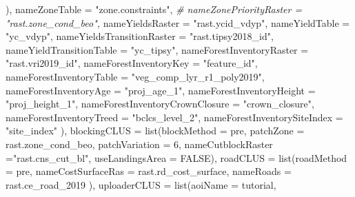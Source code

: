 \documentclass[
]{article}
\newenvironment{Shaded}{\begin{snugshade}}{\end{snugshade}}
\newcommand{\AttributeTok}[1]{\textcolor[rgb]{0.77,0.63,0.00}{#1}}
\newcommand{\CommentTok}[1]{\textcolor[rgb]{0.56,0.35,0.01}{\textit{#1}}}
\newcommand{\ConstantTok}[1]{\textcolor[rgb]{0.00,0.00,0.00}{#1}}
\newcommand{\DecValTok}[1]{\textcolor[rgb]{0.00,0.00,0.81}{#1}}
\newcommand{\FunctionTok}[1]{\textcolor[rgb]{0.00,0.00,0.00}{#1}}
\newcommand{\NormalTok}[1]{#1}
\newcommand{\StringTok}[1]{\textcolor[rgb]{0.31,0.60,0.02}{#1}}
\begin{document}
\begin{Shaded}
\begin{Highlighting}[]
\NormalTok{                          ), }
                         \AttributeTok{nameZoneTable =} \StringTok{"zone.constraints"}\NormalTok{, }
                        \CommentTok{\# nameZonePriorityRaster = "rast.zone\_cond\_beo",}
                         \AttributeTok{nameYieldsRaster =} \StringTok{"rast.ycid\_vdyp"}\NormalTok{, }
                         \AttributeTok{nameYieldTable =} \StringTok{"yc\_vdyp"}\NormalTok{, }
                         \AttributeTok{nameYieldsTransitionRaster =} \StringTok{"rast.tipsy2018\_id"}\NormalTok{, }
                         \AttributeTok{nameYieldTransitionTable =} \StringTok{"yc\_tipsy"}\NormalTok{, }
                         \AttributeTok{nameForestInventoryRaster =} \StringTok{"rast.vri2019\_id"}\NormalTok{, }
                         \AttributeTok{nameForestInventoryKey =} \StringTok{"feature\_id"}\NormalTok{, }
                         \AttributeTok{nameForestInventoryTable =} \StringTok{"veg\_comp\_lyr\_r1\_poly2019"}\NormalTok{, }
                         \AttributeTok{nameForestInventoryAge =} \StringTok{"proj\_age\_1"}\NormalTok{, }
                         \AttributeTok{nameForestInventoryHeight =} \StringTok{"proj\_height\_1"}\NormalTok{, }
                         \AttributeTok{nameForestInventoryCrownClosure =} \StringTok{"crown\_closure"}\NormalTok{, }
                         \AttributeTok{nameForestInventoryTreed =} \StringTok{"bclcs\_level\_2"}\NormalTok{,}
                         \AttributeTok{nameForestInventorySiteIndex =} \StringTok{"site\_index"}  
\NormalTok{                    ),}
  \AttributeTok{blockingCLUS =} \FunctionTok{list}\NormalTok{(}\AttributeTok{blockMethod =} \StringTok{\textquotesingle{}pre\textquotesingle{}}\NormalTok{, }
                      \AttributeTok{patchZone =} \StringTok{\textquotesingle{}rast.zone\_cond\_beo\textquotesingle{}}\NormalTok{, }
                      \AttributeTok{patchVariation =} \DecValTok{6}\NormalTok{,}
                      \AttributeTok{nameCutblockRaster =}\StringTok{"rast.cns\_cut\_bl"}\NormalTok{, }
                      \AttributeTok{useLandingsArea =} \ConstantTok{FALSE}\NormalTok{),}
  \AttributeTok{roadCLUS =} \FunctionTok{list}\NormalTok{(}\AttributeTok{roadMethod =} \StringTok{\textquotesingle{}pre\textquotesingle{}}\NormalTok{,}
                  \AttributeTok{nameCostSurfaceRas =} \StringTok{\textquotesingle{}rast.rd\_cost\_surface\textquotesingle{}}\NormalTok{, }
                  \AttributeTok{nameRoads =}  \StringTok{\textquotesingle{}rast.ce\_road\_2019\textquotesingle{}}
\NormalTok{                  ),}
  \AttributeTok{uploaderCLUS =} \FunctionTok{list}\NormalTok{(}\AttributeTok{aoiName =} \StringTok{\textquotesingle{}tutorial\textquotesingle{}}\NormalTok{,}

\end{Highlighting}
\end{Shaded}
\end{document}
